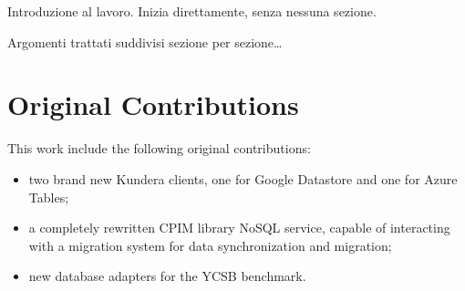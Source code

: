 Introduzione al lavoro. Inizia direttamente, senza nessuna sezione.

\noindent Argomenti trattati suddivisi sezione per sezione\dots

\section*{Original Contributions}
This work include the following original contributions:
\begin{itemize}
\item two brand new Kundera clients, one for Google Datastore and one for Azure Tables;
\item a completely rewritten CPIM library NoSQL service, capable of interacting with a migration system for data synchronization and migration; 
\item new database adapters for the YCSB benchmark.
\end{itemize}

